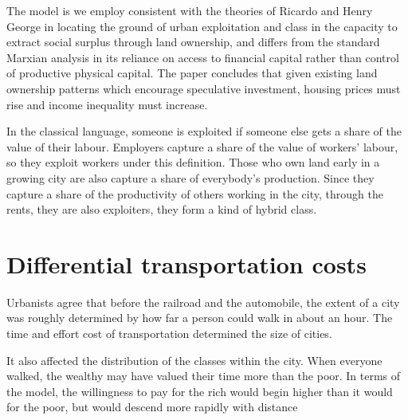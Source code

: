 The model is we employ consistent with the theories of Ricardo and Henry George in locating the ground of urban exploitation and class in the capacity to extract social surplus through land ownership, and differs from the standard Marxian analysis in its reliance on access to financial capital rather than control of productive physical capital. The paper concludes that given existing land ownership patterns which encourage speculative investment, housing prices must rise and income inequality must increase. 

In the classical language, someone is exploited if someone else gets a share of the value of their labour. %
 Employers capture a share of the value of workers' labour, so they exploit workers under this definition.
Those who own land early in a growing city are also capture a share of everybody's production. Since they capture a share of the productivity of others working in the city, through the rents, they are also exploiters, they form a kind of hybrid class. %



\section{Differential transportation costs}
 Urbanists agree that before the railroad and the automobile, the extent of a city was roughly determined by how far a person could walk in about an hour. The time and effort cost of transportation determined the size of cities. 
 
 It also affected the distribution of the classes within the city. When everyone walked, the  wealthy may have valued their time more than the poor. In terms of the model, the willingness to pay for the rich would begin higher than it would for the poor, but would descend more rapidly with distance

\begin{center}
\end{center}

